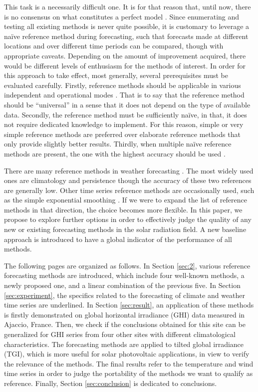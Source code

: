 This task is a necessarily difficult one. It is for that reason that, until now, there is no consensus on what constitutes a perfect model \citep{elke,FLIESS2018519,SOUBDHAN2016246}. Since enumerating and testing all existing methods is never quite possible, it is customary to leverage a na\"ive reference method during forecasting, such that forecasts made at different locations and over different time periods can be compared, though with appropriate caveats. Depending on the amount of improvement acquired, there would be different levels of enthusiasm for the methods of interest. 
In order for this approach to take effect, most generally, several prerequisites must be evaluated carefully. Firstly, reference methods should be applicable in various independent and operational modes \citep{DAVID2021672,en13143565,doi:10.1063/1.5114985,YANG2019410}. That is to say that the reference method should be ``universal'' in a sense that it does not depend on the type of available data. Secondly, the reference method must be sufficiently na\"ive, in that, it does not require dedicated knowledge to implement. For this reason, simple or very simple reference methods are preferred over elaborate reference methods that only provide slightly better results. Thirdly, when multiple na\"ive reference methods are present, the one with the highest accuracy should be used \citep{murphy_climatology_1992}. 

There are many reference methods in weather forecasting \citep{HONG2014357,9218967}. The most widely used ones are climatology and persistence \citep{YANG2019981} though the accuracy of these two references are generally low. Other time series reference methods are occasionally used, such as the simple exponential smoothing \citep{hyndman_forecasting_2018}. If we were to expand the list of reference methods in that direction, the choice becomes more flexible. In this paper, we propose to explore further options in order to effectively judge the quality of any new or existing forecasting methods in the solar radiation field. A new baseline approach is introduced to have a global indicator of the performance of all methods. 

The following pages are organized as follows. In Section \ref{sec:2}, various reference forecasting methods are introduced, which include four well-known methods, a newly proposed one, and a linear combination of the previous five. In Section \ref{sec:experiment}, the specifics related to the forecasting of climate and weather time series are underlined. In Section \ref{sec:result}, an application of these methods is firstly demonstrated on global horizontal irradiance (GHI) data measured in Ajaccio, France. Then, we check if the conclusions obtained for this site can be generalized for GHI series from four other sites with different climatological characteristics. The forecasting methods are applied to tilted global irradiance (TGI), which is more useful for solar photovoltaic applications, in view to verify the relevance of the methods. The final results refer to the temperature and wind time series in order to judge the portability of the methods we want to qualify as reference. Finally, Section \ref{sec:conclusion} is dedicated to conclusions.


